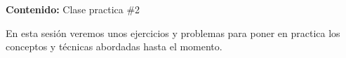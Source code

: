 {\Large\textbf{Contenido:} Clase practica \#2}

En esta sesión veremos unos ejercicios y problemas para poner en practica los conceptos y técnicas abordadas hasta el
momento.